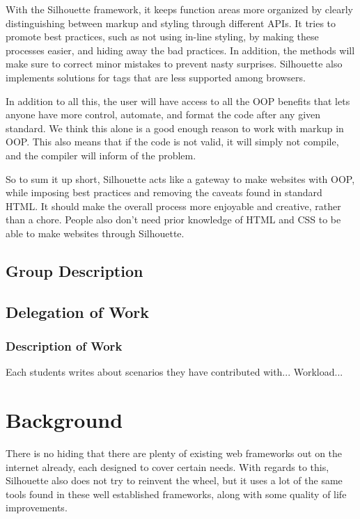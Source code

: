 \documentclass[12pt]{article}
\begin{document}
With the Silhouette framework, it keeps function areas more organized by clearly distinguishing between markup and styling through different APIs. It tries to promote best practices, such as not using in-line styling, by making these processes easier, and hiding away the bad practices. In addition, the methods will make sure to correct minor mistakes to prevent nasty surprises. Silhouette also implements solutions for tags that are less supported among browsers. 

In addition to all this, the user will have access to all the OOP benefits that lets anyone have more control, automate, and format the code after any given standard. We think this alone is a good enough reason to work with markup in OOP. This also means that if the code is not valid, it will simply not compile, and the compiler will inform of the problem.

So to sum it up short, Silhouette acts like a gateway to make websites with OOP, while imposing best practices and removing the caveats found in standard HTML. It should make the overall process more enjoyable and creative, rather than a chore. People also don't need prior knowledge of HTML and CSS to be able to make websites through Silhouette.

\subsection{Group Description}

    \subsection{Delegation of Work}

    \subsubsection{Description of Work}
    Each students writes about scenarios they have contributed with...
    Workload...

\section{Background}

There is no hiding that there are plenty of existing web frameworks out on the internet already, each designed to cover certain needs. With regards to this, Silhouette also does not try to reinvent the wheel, but it uses a lot of the same tools found in these well established frameworks, along with some quality of life improvements.
\end{document}
